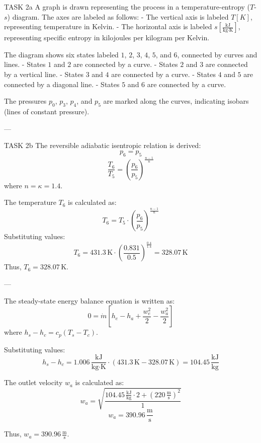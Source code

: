 TASK 2a  
A graph is drawn representing the process in a temperature-entropy (\( T \)-\( s \)) diagram. The axes are labeled as follows:  
- The vertical axis is labeled \( T [K] \), representing temperature in Kelvin.  
- The horizontal axis is labeled \( s [\frac{\text{kJ}}{\text{kg·K}}] \), representing specific entropy in kilojoules per kilogram per Kelvin.  

The diagram shows six states labeled \( 1 \), \( 2 \), \( 3 \), \( 4 \), \( 5 \), and \( 6 \), connected by curves and lines.  
- States \( 1 \) and \( 2 \) are connected by a curve.  
- States \( 2 \) and \( 3 \) are connected by a vertical line.  
- States \( 3 \) and \( 4 \) are connected by a curve.  
- States \( 4 \) and \( 5 \) are connected by a diagonal line.  
- States \( 5 \) and \( 6 \) are connected by a curve.  

The pressures \( p_0 \), \( p_3 \), \( p_4 \), and \( p_5 \) are marked along the curves, indicating isobars (lines of constant pressure).  

---

TASK 2b  
The reversible adiabatic isentropic relation is derived:  
\[
p_6 = p_5
\]
\[
\frac{T_6}{T_5} = \left( \frac{p_6}{p_5} \right)^{\frac{n-1}{n}}
\]
where \( n = \kappa = 1.4 \).  

The temperature \( T_6 \) is calculated as:  
\[
T_6 = T_5 \cdot \left( \frac{p_6}{p_5} \right)^{\frac{n-1}{n}}
\]
Substituting values:  
\[
T_6 = 431.3 \, \text{K} \cdot \left( \frac{0.831}{0.5} \right)^{\frac{0.4}{1.4}} = 328.07 \, \text{K}
\]
Thus, \( T_6 = 328.07 \, \text{K} \).  

---

The steady-state energy balance equation is written as:  
\[
0 = \dot{m} \left[ h_e - h_a + \frac{w_e^2}{2} - \frac{w_a^2}{2} \right]
\]
where \( h_s - h_c = c_p (T_s - T_c) \).  

Substituting values:  
\[
h_s - h_c = 1.006 \, \frac{\text{kJ}}{\text{kg·K}} \cdot (431.3 \, \text{K} - 328.07 \, \text{K}) = 104.45 \, \frac{\text{kJ}}{\text{kg}}
\]

The outlet velocity \( w_a \) is calculated as:  
\[
w_a = \sqrt{\frac{104.45 \, \frac{\text{kJ}}{\text{kg}} \cdot 2 + (220 \, \frac{\text{m}}{\text{s}})^2}{1}}
\]
\[
w_a = 390.96 \, \frac{\text{m}}{\text{s}}
\]  

Thus, \( w_a = 390.96 \, \frac{\text{m}}{\text{s}} \).